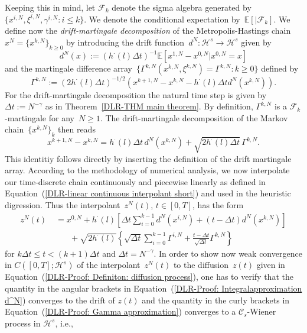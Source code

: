 Keeping this in mind, let $\mathcal{F}_k$ denote the sigma algebra generated by~$\{ x^{i,N}, \xi^{i,N}, \gamma^{i,N} : i \leq k  \}$. We denote the conditional expectation by~$\mathbb{E}[|\mathcal{F}_k]$. We define now the \textit{drift-martingale decomposition} of the Metropolis-Hastings chain~$x^N = \{ x^{k,N} \}_{k \geq 0}$ by introducing the drift function~$d^N: \mathcal{H}^s \to \mathcal{H}^s$ given by
\begin{equation}
\label{DLR-Proof: Definition drift function d^N}
d^N (x) := \left(  h^{\cdot}(l) \Delta t \right)^{-1} \mathbb{E} \left[ x^{1,N} - x^{0,N} | x^{0,N} = x \right] 
\end{equation}
and the martingale difference array~$\{ \Gamma^{k,N} (x^{k,N}, \xi^{k,N})= \Gamma^{k,N} : k \geq 0 \}$ defined by
\begin{equation}
 \label{DLR-Proof: Definiton martingale difference array}
 \Gamma^{k,N} := \left( 2 h^{\cdot}(l) \Delta t \right)^{-1/2} \left( x^{k+1,N} -x^{k,N} - h^{\cdot}(l) \Delta t d^N (x^{k,N})  \right).
\end{equation}
For the drift-martingale decomposition the natural time step is given by $\Delta t := N^{-\gamma}$ as in Theorem~\ref{DLR-THM main theorem}. By definition, $\Gamma^{k,N}$ is a $\mathcal{F}_k$-martingale for any~$N\geq1$. The drift-martingale decomposition of the Markov chain~$\{ x^{k,N} \}_{k}$ then reads
\begin{equation}
 \label{DLR-Proof: Definition drift-martingale decomposition}
 x^{k+1,N} - x^{k,N} = h^{\cdot}(l) \Delta t \, d^N(x^{k,N}) + \sqrt{2 h^{\cdot}(l) \Delta t} \, \Gamma^{k,N}.
\end{equation}
This identitiy follows directly by inserting the definition of the drift martingale array. According to the methodology of numerical analysis, we now interpolate our time-discrete chain continuously and piecewise linearly as defined in Equation~(\ref{DLR-linear continuous interpolant short}) and used in the heuristic digression. Thus the interpolant~$z^N(t)$, $t \in [0,T]$, has the form 
\begin{align}
  z^N(t) & \; = x^{0,N} + h^{\cdot}(l) \left[ \Delta t \sum_{i=0}^{k-1} d^N(x^{i,N}) + (t - \Delta t) d^N(x^{k,N}) \right] \label{DLR-Proof: Integralapproximation d^N} \\ 
  & \qquad + \sqrt{2 h^{\cdot}(l)} \left\{ \sqrt{ \Delta t} \sum_{i=0}^{k-1} \Gamma^{i,N} +  \frac{t - \Delta t}{\sqrt{\Delta t}} \Gamma^{k,N} \right\} \label{DLR-Proof: Gamma approximation}
\end{align}
for $k \Delta t \leq t  < (k+1) \Delta t $ and $\Delta t = N^{-\gamma}$. In order to show now weak convergence in $C([0,T];\mathcal{H}^s)$ of the interpolant~$z^N(t)$ to the diffusion~$z(t)$ given in Equation~(\ref{DLR-Proof: Definiton: diffusion process}), one has to verify that the quantity in the angular brackets in Equation~(\ref{DLR-Proof: Integralapproximation d^N}) converges to the drift of $z(t)$ and the quantity in the curly brackets in Equation~(\ref{DLR-Proof: Gamma approximation}) converges to a $\mathcal{C}_s$-Wiener process in $\mathcal{H}^s$, i.e.,
